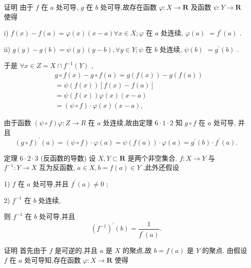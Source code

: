 证明 由于 $f$ 在 $a$ 处可导, $g$ 在 $b$ 处可导,故存在函数 $\varphi  : X \rightarrow  \mathbf{R}$ 及函数 $\psi  : Y \rightarrow  \mathbf{R}$ 使得

i) $f\left( x\right)  - f\left( a\right)  = \varphi \left( x\right) \left( {x - a}\right) \forall x \in  X;\varphi$ 在 $a$ 处连续, $\varphi \left( a\right)$  $= {f}^{\prime }\left( a\right)$ .

ii) $g\left( y\right)  - g\left( b\right)  = \psi \left( y\right) \left( {y - b}\right) ,\forall y \in  Y;\psi$ 在 $b$ 处连续, $\psi \left( b\right)$  $= {g}^{\prime }\left( b\right)$ .

于是 $\forall x \in  Z = X \cap  {f}^{-1}\left( Y\right)$ ,
\begin{align*}
	&g \circ  f\left( x\right)  - g \circ  f\left( a\right)  = g\left( {f\left( x\right) }\right)  - g\left( {f\left( a\right) }\right)\\
	&= \psi \left( {f\left( x\right) }\right) \left\lbrack  {f\left( x\right)  - f\left( a\right) }\right\rbrack\\
	&= \psi \left( {f\left( x\right) }\right) \varphi \left( x\right) \left( {x - a}\right)\\
	&= \left( {\psi  \circ  f}\right)  \cdot  \varphi \left( x\right) \left( {x - a}\right) ,
\end{align*}

由于函数 $\left( {\psi  \circ  f}\right) \varphi  : Z \rightarrow  R$ 在 $a$ 处连续,故由定理 $6 \cdot  1 \cdot  2$ 知 $g \circ  f$ 在 $a$ 处可导, 并且
$${\left( g \circ  f\right) }^{\prime }\left( a\right)  = \left( {\psi  \circ  f}\right)  \cdot  \varphi \left( a\right)  = \psi \left( {f\left( a\right) }\right)  \cdot  \varphi \left( a\right)  = {g}^{\prime }\left( b\right)  \cdot  {f}^{\prime }\left( a\right) .$$

定理 $6 \cdot  2 \cdot  3$ (反函数的导数) 设 $X,Y \subset  \mathbf{R}$ 是两个非空集合. $f : X \rightarrow  Y$ 与 ${f}^{-1} : Y \rightarrow  X$ 互为反函数, $a \in  X,b = f\left( a\right)  \in  Y$ ,此外还假设

1) $f$ 在 $a$ 处可导,并且 ${f}^{\prime }\left( a\right)  \neq  0$ ;

2) ${f}^{-1}$ 在 $b$ 处连续,

则 ${f}^{-1}$ 在 $b$ 处可导,并且
$${\left( {f}^{-1}\right) }^{\prime }\left( b\right)  = \frac{1}{{f}^{\prime }\left( a\right) }.$$

证明 首先由于 $f$ 是可逆的,并且 $a$ 是 $X$ 的聚点,故 $b = f\left( a\right)$ 是 $Y$ 的聚点. 由假设 $f$ 在 $a$ 处可导知,存在函数 $\varphi  : X \rightarrow  \mathbf{R}$ 使得

